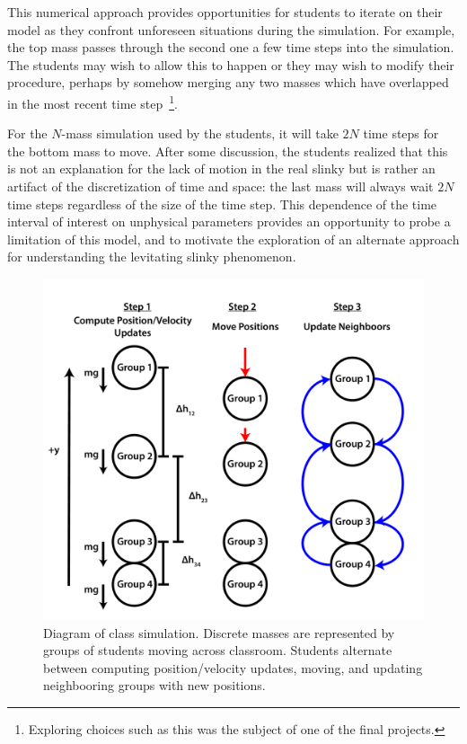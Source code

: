 \documentclass[pre,preprint,superscriptaddress,longbibliography]{revtex4-1}
\newcommand{\FIGdiscrete}{
\begin{figure}[t]\center
\includegraphics[width=\columnwidth]{./img/discrete_model.pdf}
\caption{\label{fig:discrete} Diagram of class simulation. Discrete masses are represented by groups of students moving across classroom. Students alternate between computing position/velocity updates, moving, and updating neighbooring groups with new positions.}
\end{figure}
}
\begin{document}
This numerical approach provides opportunities for students to iterate on their model as they confront unforeseen situations during the simulation. For example, the top mass passes through the second one a few time steps into the simulation.   %
The students may wish to allow this to happen
or they may wish to modify their procedure, perhaps by somehow merging any two masses which have overlapped
in the most recent time step~\footnote{Exploring choices such as this was the subject of one of the final projects.}.




For the $N$-mass simulation used by the students, it will take $2N$ time steps for the bottom mass to move.  After some discussion, the students realized that this is not an explanation for the lack of motion in the real slinky but is rather an artifact of the discretization of time and space:
the last mass will always wait $2N$ time steps regardless of the size of the time step. 
This dependence of the time interval of interest on unphysical parameters provides an opportunity to probe a limitation of this model, and to motivate the exploration of an alternate approach for understanding the levitating slinky phenomenon.
\FIGdiscrete
\end{document}
